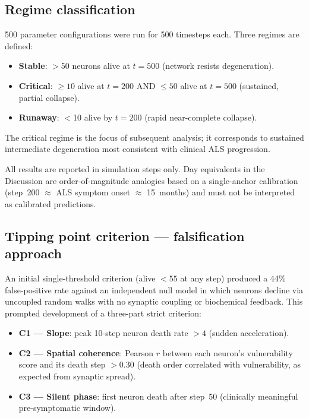 \documentclass[12pt,a4paper]{article}
\begin{document}
\subsection{Regime classification}

500 parameter configurations were run for 500 timesteps each. Three regimes are defined:

\begin{itemize}
\item \textbf{Stable}: $>$50 neurons alive at $t = 500$ (network resists degeneration).
\item \textbf{Critical}: $\geq 10$ alive at $t = 200$ AND $\leq 50$ alive at $t = 500$
(sustained, partial collapse).
\item \textbf{Runaway}: $<$10 alive by $t = 200$ (rapid near-complete collapse).
\end{itemize}

The critical regime is the focus of subsequent analysis; it corresponds to sustained
intermediate degeneration most consistent with clinical ALS progression.

All results are reported in simulation steps only. Day equivalents in the Discussion are
order-of-magnitude analogies based on a single-anchor calibration (step~200 $\approx$ ALS
symptom onset $\approx$ 15~months) and must not be interpreted as calibrated predictions.

\subsection{Tipping point criterion --- falsification approach}

An initial single-threshold criterion (alive $< 55$ at any step) produced a 44\% false-positive
rate against an independent null model in which neurons decline via uncoupled random walks with
no synaptic coupling or biochemical feedback. This prompted development of a three-part strict
criterion:

\begin{itemize}
\item \textbf{C1 --- Slope}: peak 10-step neuron death rate $> 4$ (sudden acceleration).
\item \textbf{C2 --- Spatial coherence}: Pearson $r$ between each neuron's vulnerability score
and its death step $> 0.30$ (death order correlated with vulnerability, as expected from
synaptic spread).
\item \textbf{C3 --- Silent phase}: first neuron death after step~50 (clinically meaningful
pre-symptomatic window).
\end{itemize}
\end{document}
